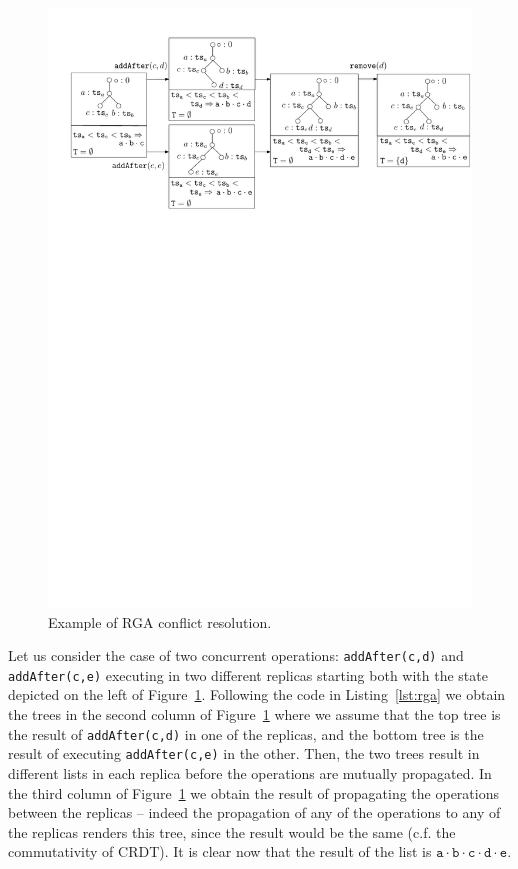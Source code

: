 \begin{figure}[t]
  \centering
  \includegraphics[width=.8\textwidth]{figures/RGA-Trace}
  \caption{Example of RGA conflict resolution.}
  \label{fig:rga-trace}
\end{figure}

Let us consider the case of two concurrent operations:
\lstinline|addAfter(c,d)| and \lstinline|addAfter(c,e)| executing in
two different replicas starting both with the state depicted on the
left of Figure~\ref{fig:rga-trace}.
%
Following the code in Listing~\ref{lst:rga} we obtain the trees in the
second column of Figure~\ref{fig:rga-trace} where we assume that the
top tree is the result of \lstinline|addAfter(c,d)| in one of the
replicas, and the bottom tree is the result of executing
\lstinline|addAfter(c,e)| in the other.
%
Then, the two trees result in different lists in each
replica before the operations are mutually propagated.
%
In the third column of Figure~\ref{fig:rga-trace} we obtain the
result of propagating the operations between the replicas -- indeed
the propagation of any of the operations to any of the replicas
renders this tree, since the result would be the same (c.f. the
commutativity of CRDT).
%
It is clear now that the result of the list is $\mathtt{a \cdot b
  \cdot c \cdot d \cdot e}$.


